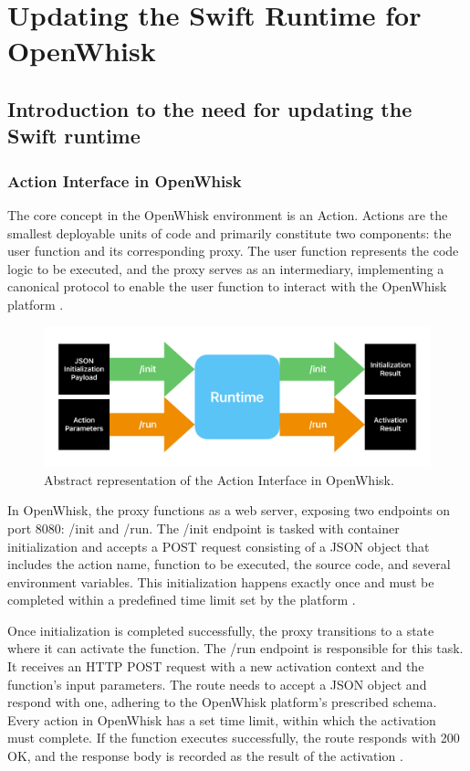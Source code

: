 \chapter{Updating the Swift Runtime for OpenWhisk}
\etocsettocstyle{\rule{\textwidth}{1pt}}{\rule{\textwidth}{1pt}} %
\localtableofcontents

\section{Introduction to the need for updating the Swift runtime}
\subsection{Action Interface in OpenWhisk}

The core concept in the OpenWhisk environment is an Action. Actions are the smallest deployable units of code and primarily constitute two components: the user function and its corresponding proxy. The user function represents the code logic to be executed, and the proxy serves as an intermediary, implementing a canonical protocol to enable the user function to interact with the OpenWhisk platform \cite{openwhisk2023}.
\begin{figure}[h]
    \centering
    \includegraphics[width=\textwidth]{media/action_interface.pdf}
    \caption{Abstract representation of the Action Interface in OpenWhisk.}
    \label{fig:actioninterface}
\end{figure}

In OpenWhisk, the proxy functions as a web server, exposing two endpoints on port 8080: /init and /run. The /init endpoint is tasked with container initialization and accepts a POST request consisting of a JSON object that includes the action name, function to be executed, the source code, and several environment variables. This initialization happens exactly once and must be completed within a predefined time limit set by the platform \cite{openwhisk2023}.

Once initialization is completed successfully, the proxy transitions to a state where it can activate the function. The /run endpoint is responsible for this task. It receives an HTTP POST request with a new activation context and the function's input parameters. The route needs to accept a JSON object and respond with one, adhering to the OpenWhisk platform's prescribed schema. Every action in OpenWhisk has a set time limit, within which the activation must complete. If the function executes successfully, the route responds with 200 OK, and the response body is recorded as the result of the activation \cite{openwhisk2023}.

